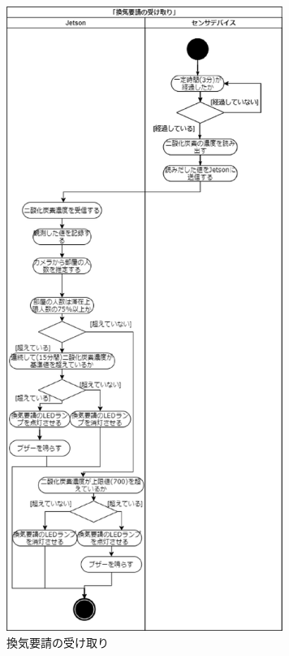 \begin{figure}[H]
	\centering
	\includegraphics[width=9.0cm]{a_kanki.eps}
	\caption{換気要請の受け取り}
	\label{a_kanki}
\end{figure}

